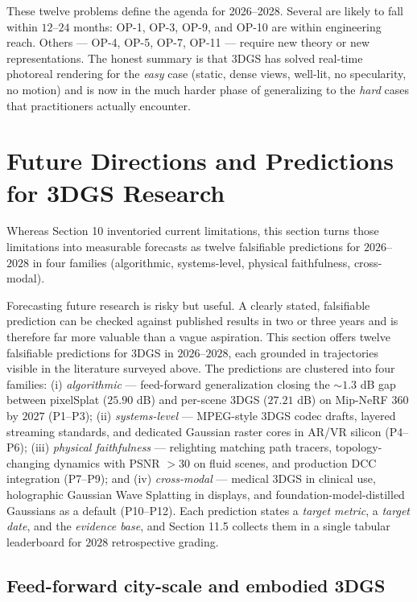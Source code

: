 \documentclass{article}
\begin{document}
These twelve problems define the agenda for 2026--2028. Several are likely to fall within \(12\)--\(24\) months: OP-1, OP-3, OP-9, and OP-10 are within engineering reach. Others --- OP-4, OP-5, OP-7, OP-11 --- require new theory or new representations. The honest summary is that 3DGS has solved real-time photoreal rendering for the \emph{easy} case (static, dense views, well-lit, no specularity, no motion) and is now in the much harder phase of generalizing to the \emph{hard} cases that practitioners actually encounter.

\section{Future Directions and Predictions for 3DGS Research}\label{future-directions-and-predictions-for-3dgs-research}

Whereas Section 10 inventoried current limitations, this section turns those limitations into measurable forecasts as twelve falsifiable predictions for \(2026\)--\(2028\) in four families (algorithmic, systems-level, physical faithfulness, cross-modal).

Forecasting future research is risky but useful. A clearly stated, falsifiable prediction can be checked against published results in two or three years and is therefore far more valuable than a vague aspiration. This section offers twelve falsifiable predictions for 3DGS in \(2026\)--\(2028\), each grounded in trajectories visible in the literature surveyed above. The predictions are clustered into four families: (i) \emph{algorithmic} --- feed-forward generalization closing the \(\sim\!1.3\) dB gap between pixelSplat (\(25.90\) dB) and per-scene 3DGS (\(27.21\) dB) on Mip-NeRF 360 by \(2027\) (P1--P3); (ii) \emph{systems-level} --- MPEG-style 3DGS codec drafts, layered streaming standards, and dedicated Gaussian raster cores in AR/VR silicon (P4--P6); (iii) \emph{physical faithfulness} --- relighting matching path tracers, topology-changing dynamics with PSNR \(>30\) on fluid scenes, and production DCC integration (P7--P9); and (iv) \emph{cross-modal} --- medical 3DGS in clinical use, holographic Gaussian Wave Splatting in displays, and foundation-model-distilled Gaussians as a default (P10--P12). Each prediction states a \emph{target metric}, a \emph{target date}, and the \emph{evidence base}, and Section 11.5 collects them in a single tabular leaderboard for \(2028\) retrospective grading.

\subsection{Feed-forward city-scale and embodied 3DGS}\label{feed-forward-city-scale-and-embodied-3dgs}
\end{document}
